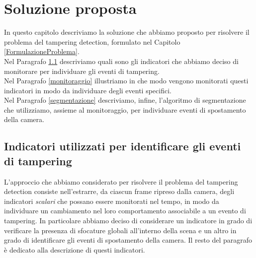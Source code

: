 \chapter{Soluzione proposta}
\label{SoluzioneProposta}
\thispagestyle{empty}

\vspace{0.5cm}

\noindent In questo capitolo descriviamo la soluzione che abbiamo proposto per risolvere il problema del tampering detection, formulato nel Capitolo \ref{FormulazioneProblema}.\\
Nel Paragrafo \ref{indicatori} descriviamo quali sono gli indicatori che abbiamo deciso di monitorare per individuare gli eventi di tampering.\\
Nel Paragrafo  \ref{monitoraggio} illustriamo in che modo vengono monitorati questi indicatori in modo da individuare degli eventi specifici.\\
Nel Paragrafo \ref{segmentazione} descriviamo, infine, l'algoritmo di segmentazione che utilizziamo, assieme al monitoraggio, per individuare eventi di spostamento della camera.
\section{Indicatori utilizzati per identificare gli eventi di tampering}
\label{indicatori}
L'approccio che abbiamo considerato per risolvere il problema del tampering detection consiste nell'estrarre, da ciascun frame ripreso dalla camera, degli indicatori \textit{scalari} che possano essere monitorati nel tempo, in modo da individuare un cambiamento nel loro comportamento associabile a un evento di tampering. 
In particolare abbiamo deciso di considerare un indicatore in grado di verificare la presenza di sfocature globali all'interno della scena e un altro in grado di identificare gli eventi di spostamento della camera.
Il resto del paragrafo \`e dedicato alla descrizione di questi indicatori.
